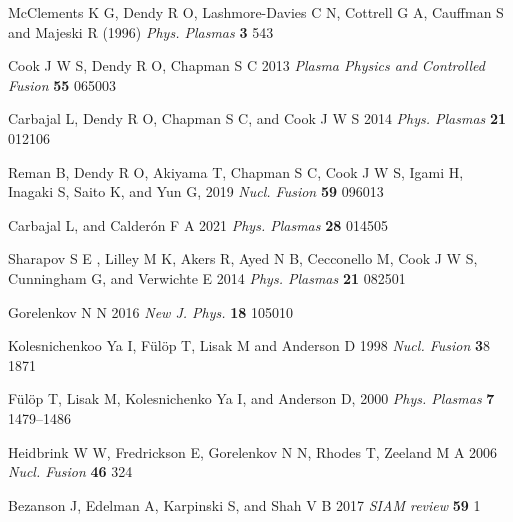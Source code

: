 \documentclass[12pt]{iopart}
\begin{document}
\begin{thebibliography}{9}
McClements K G, Dendy R O, Lashmore-Davies C N, Cottrell G A, Cauffman S and Majeski R (1996) \textit{Phys. Plasmas} \textbf{3} 543

Cook J W S, Dendy R O, Chapman S C 2013 \textit{Plasma Physics and Controlled Fusion} \textbf{55} 065003

Carbajal L, Dendy R O, Chapman S C, and Cook J W S 2014 \textit{Phys. Plasmas} \textbf{21} 012106

Reman B, Dendy R O, Akiyama T, Chapman S C, Cook J W S, Igami  H, Inagaki S, Saito K, and Yun G, 2019 \textit{Nucl. Fusion} \textbf{59} 096013

Carbajal L, and Calderón F A 2021 \textit{Phys. Plasmas} \textbf{28} 014505

Sharapov S E , Lilley M K, Akers R, Ayed N B, Cecconello M, Cook J W S, Cunningham G, and Verwichte E 2014 \textit{Phys. Plasmas} \textbf{21} 082501

Gorelenkov N N 2016 \textit{New J. Phys.} \textbf{18} 105010

Kolesnichenkoo Ya I, F{\"u}l{\"o}p T, Lisak M and Anderson D 1998 \textit{Nucl. Fusion} {\textbf 38} 1871

F{\"u}l{\"o}p T, Lisak M, Kolesnichenko Ya I, and Anderson D, 2000 \textit{Phys. Plasmas} \textbf{7} 1479–1486

Heidbrink W W, Fredrickson E, Gorelenkov N N, Rhodes T, Zeeland  M A 2006 \textit{Nucl. Fusion} \textbf{46} 324

Bezanson J, Edelman A, Karpinski S, and Shah V B 2017 \textit{SIAM review} \textbf{59} 1


\end{thebibliography}
\end{document}
